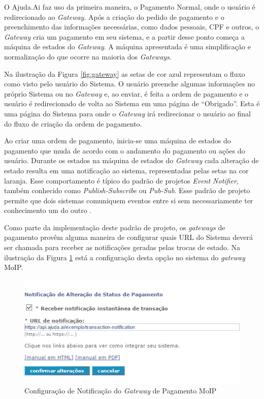 O Ajuda.Ai faz uso da primeira maneira, o Pagamento Normal, onde o usuário é redirecionado ao \emph{Gateway}. Após a criação do pedido de pagamento e o preenchimento das informações necessárias, como dados pessoais, CPF e outros, o \emph{Gateway} cria um pagamento em seu sistema, e a partir desse ponto começa a máquina de estados do \emph{Gateway}. A máquina apresentada é uma simplificação e normalização do que ocorre na maioria dos \emph{Gateways}.

Na ilustração da Figura \ref{fig:gateway} as setas de cor azul representam o fluxo como visto pelo usuário do Sistema. O usuário preenche algumas informações no próprio Sistema ou no \emph{Gateway} e, ao enviar, é feita a ordem de pagamento e o usuário é redirecionado de volta ao Sistema em uma página de ``Obrigado''. Esta é uma página do Sistema para onde o \emph{Gateway} irá redirecionar o usuário ao final do fluxo de criação da ordem de pagamento.

Ao criar uma ordem de pagamento, inicia-se uma máquina de estados do pagamento que muda de acordo com o andamento do pagamento ou ações do usuário. Durante os estados na máquina de estados do \emph{Gateway} cada alteração de estado resulta em uma notificação ao sistema, representadas pelas setas na cor laranja. Esse comportamento é típico do padrão de projetos \emph{Event Notifier}, também conhecido como \emph{Publish-Subscribe} ou \emph{Pub-Sub}. Esse padrão de projeto permite que dois sistemas comuniquem eventos entre si sem necessariamente ter conhecimento um do outro \cite{gupta2000event}.

Como parte da implementação deste padrão de projeto, os \emph{gateways} de pagamento provêm alguma maneira de configurar quais URL do Sistema deverá ser chamada para receber as notificações geradas pelas trocas de estado. Na ilustração da Figura \ref{fig:config_moip} está a configuração desta opção no sistema do \emph{gateway} MoIP.

\begin{figure}[H]
	\caption{\label{fig:config_moip}Configuração de Notificação do \emph{Gateway} de Pagamento MoIP}
    \centering
    \includegraphics[scale=0.85]{imagens/config-moip.png}
\end{figure}


